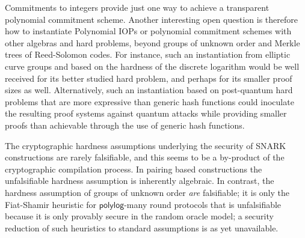 Commitments to integers provide just one way to achieve a transparent polynomial commitment scheme. Another interesting open question is therefore how to instantiate Polynomial IOPs or polynomial commitment schemes with other algebras and hard problems, beyond groups of unknown order and Merkle trees of Reed-Solomon codes. For instance, such an instantiation from elliptic curve groups and based on the hardness of the discrete logarithm would be well received for its better studied hard problem, and perhaps for its smaller proof sizes as well. Alternatively, such an instantiation based on post-quantum hard problems that are more expressive than generic hash functions could inoculate the resulting proof systems against quantum attacks while providing smaller proofs than achievable through the use of generic hash functions.

The cryptographic hardness assumptions underlying the security of SNARK constructions are rarely falsifiable, and this seems to be a by-product of the cryptographic compilation process. In pairing based constructions the unfalsifiable hardness assumption is inherently algebraic. In contrast, the hardness assumption of groups of unknown order \emph{are} falsifiable; it is only the Fiat-Shamir heuristic for $\mathsf{polylog}$-many round protocols that is unfalsifiable because it is only provably secure in the random oracle model; a security reduction of such heuristics to standard assumptions is as yet unavailable.